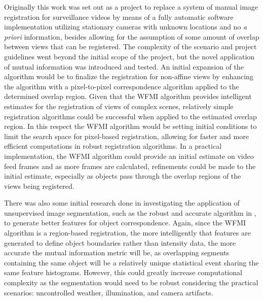%
%
%
%
%
%
%
%
%

%
%
%



Originally this work was set out as a project to replace a system of manual image registration for surveillance videos by means of a fully automatic software implementation utilizing stationary cameras with unknown locations and no \textit{a priori} information, besides allowing for the assumption of some amount of overlap between views that can be registered. The complexity of the scenario and project guidelines went beyond the initial scope of the project, but the novel application of mutual information was introduced and tested. An initial expansion of the algorithm would be to finalize the registration for non-affine views by enhancing the algorithm with a pixel-to-pixel correspondence algorithm applied to the determined overlap region. Given that the WFMI algorithm provides intelligent estimates for the registration of views of complex scenes, relatively simple registration algorithms could be successful when applied to the estimated overlap region. In this respect the WFMI algorithm would be setting initial conditions to limit the search space for pixel-based registration, allowing for faster and more efficient computations in robust registration algorithms. In a practical implementation, the WFMI algorithm could provide an initial estimate on video feed frames and as more frames are calculated, refinements could be made to the initial estimate, especially as objects pass through the overlap regions of the views being registered.

There was also some initial research done in investigating the application of unsupervised image segmentation, such as the robust and accurate algorithm in \cite{Ugarriza2009}, to generate better features for object correspondence. Again, since the WFMI algorithm is a region-based registration, the more intelligently that features are generated to define object boundaries rather than intensity data, the more accurate the mutual information metric will be, as overlapping segments containing the same object will be a relatively unique statistical event sharing the same feature histograms. However, this could greatly increase computational complexity as the segmentation would need to be robust considering the practical scenarios: uncontrolled weather, illumination, and camera artifacts.

